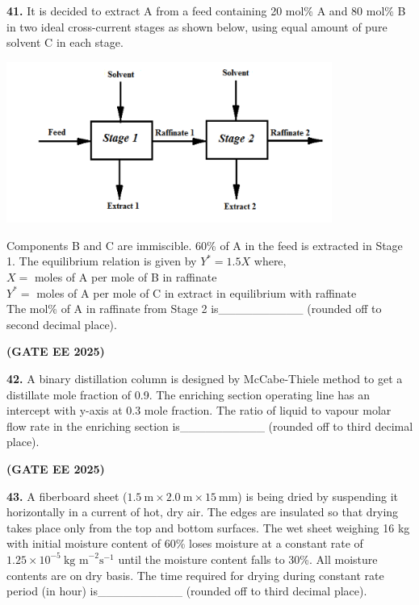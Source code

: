 \documentclass[journal,12pt,onecolumn]{IEEEtran}
\newcommand{\brak}[1]{(#1)}
\begin{document}
\noindent\textbf{41.} It is decided to extract A from a feed containing 20 mol\% A and 80 mol\% B in two ideal cross-current stages as shown below, using equal amount of pure solvent C in each stage.
\begin{center}
\includegraphics[width=0.8\textwidth]{figs/41.png}
\end{center}
Components B and C are immiscible. 60\% of A in the feed is extracted in Stage 1. The equilibrium relation is given by $Y^{*}=1.5 X$ where, \\
$X=$ moles of A per mole of B in raffinate \\
$Y^{*}=$ moles of A per mole of C in extract in equilibrium with raffinate
\\
The mol\% of A in raffinate from Stage 2 is\_\_\_\_\_\_\_\_\_\_ \brak{rounded off to second decimal place}.

\hfill \textbf{\brak{GATE EE 2025}}

\noindent\textbf{42.} A binary distillation column is designed by McCabe-Thiele method to get a distillate mole fraction of 0.9. The enriching section operating line has an intercept with y-axis at 0.3 mole fraction. The ratio of liquid to vapour molar flow rate in the enriching section is\_\_\_\_\_\_\_\_\_\_ \brak{rounded off to third decimal place}.

\hfill \textbf{\brak{GATE EE 2025}}

\noindent\textbf{43.} A fiberboard sheet \brak{$1.5~\text{m}\times2.0~\text{m}\times15~\text{mm}$} is being dried by suspending it horizontally in a current of hot, dry air. The edges are insulated so that drying takes place only from the top and bottom surfaces. The wet sheet weighing 16 kg with initial moisture content of 60\% loses moisture at a constant rate of $1.25\times10^{-5}~\text{kg m}^{-2}\text{s}^{-1}$ until the moisture content falls to 30\%. All moisture contents are on dry basis. The time required for drying during constant rate period \brak{in hour} is\_\_\_\_\_\_\_\_\_\_ \brak{rounded off to third decimal place}.
\end{document}
